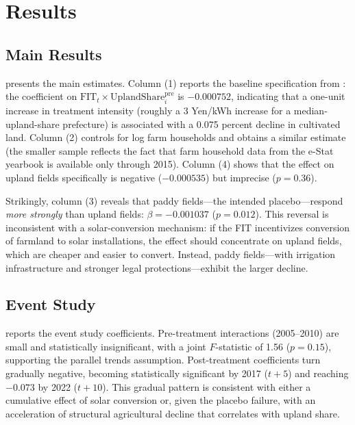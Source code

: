 \documentclass[12pt]{article}
\begin{document}
\section{Results}

\subsection{Main Results}



 presents the main estimates. Column (1) reports the baseline specification from : the coefficient on $\text{FIT}_t \times \text{UplandShare}_i^{\text{pre}}$ is $-0.000752$, indicating that a one-unit increase in treatment intensity (roughly a 3 Yen/kWh increase for a median-upland-share prefecture) is associated with a 0.075 percent decline in cultivated land. Column (2) controls for log farm households and obtains a similar estimate (the smaller sample reflects the fact that farm household data from the e-Stat yearbook is available only through 2015). Column (4) shows that the effect on upland fields specifically is negative ($-0.000535$) but imprecise ($p = 0.36$).

Strikingly, column (3) reveals that paddy fields---the intended placebo---respond \textit{more strongly} than upland fields: $\beta = -0.001037$ ($p = 0.012$). This reversal is inconsistent with a solar-conversion mechanism: if the FIT incentivizes conversion of farmland to solar installations, the effect should concentrate on upland fields, which are cheaper and easier to convert. Instead, paddy fields---with irrigation infrastructure and stronger legal protections---exhibit the larger decline.

\subsection{Event Study}



 reports the event study coefficients. Pre-treatment interactions (2005--2010) are small and statistically insignificant, with a joint $F$-statistic of 1.56 ($p = 0.15$), supporting the parallel trends assumption. Post-treatment coefficients turn gradually negative, becoming statistically significant by 2017 ($t+5$) and reaching $-0.073$ by 2022 ($t+10$). This gradual pattern is consistent with either a cumulative effect of solar conversion or, given the placebo failure, with an acceleration of structural agricultural decline that correlates with upland share.
\end{document}
